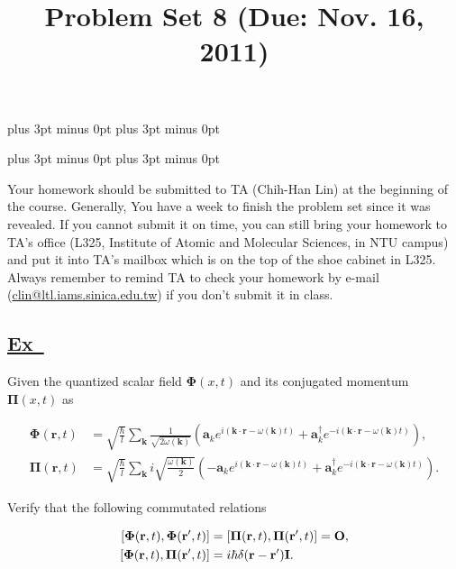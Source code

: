 \documentclass[a4paper,12pt]{article}
\newcommand{\excercise}{\addtocounter{section}{+1}
\subsection*{\underline{Ex~\thesection}}}
\begin{document}
\abovedisplayskip=-6pt plus 3pt minus 0pt
\belowdisplayskip=8pt plus 3pt minus 0pt

\abovedisplayshortskip=-6pt plus 3pt minus 0pt
\belowdisplayshortskip=8pt plus 3pt minus 0pt

\title{Problem Set 8 (Due: Nov. 16, 2011)}
\maketitle

Your homework should be submitted to TA (Chih-Han Lin) at the  beginning of the course. Generally, You have a week to finish the problem set since it was revealed. If you cannot submit it on time, you can still bring your homework to TA's office (L325, Institute of Atomic and Molecular Sciences, in NTU campus) and put it into TA's mailbox which is on the top of the shoe cabinet in L325. Always remember to remind TA to check your homework by e-mail (\url{clin@ltl.iams.sinica.edu.tw}) if you don't submit it in class.

%

\excercise
Given the quantized scalar field $\bm{\Phi}(x, t)$ and its conjugated momentum $\bm{\Pi}(x, t)$ as

\begin{align}
\bm{\Phi}(\mathbf{r},t)&= \sqrt{\frac{\hbar}{l}}\sum_\mathbf{k}\frac{1}{\sqrt{2\omega(\mathbf{k})}}\left(\bm{a}_{k}e^{i(\mathbf{k}\cdot\mathbf{r}-\omega(\mathbf{k})t)}+\bm{a}_{k}^\dag e^{-i(\mathbf{k}\cdot\mathbf{r}-\omega(\mathbf{k})t)}\right),\\
\bm{\Pi}(\mathbf{r},t)&= \sqrt{\frac{\hbar}{l}}\sum_\mathbf{k}i\sqrt{\frac{\omega(\mathbf{k})}{2}}\left(-\bm{a}_{k}e^{i(\mathbf{k}\cdot\mathbf{r}-\omega(\mathbf{k})t)}+\bm{a}_{k}^\dag e^{-i(\mathbf{k}\cdot\mathbf{r}-\omega(\mathbf{k})t)}\right).
\end{align}

Verify that the following commutated relations

\begin{align}
\protect [\bm{\Phi}(\mathbf{r},t),\bm{\Phi}(\mathbf{r}',t) ]&=[\bm{\Pi}(\mathbf{r},t),\bm{\Pi}(\mathbf{r}',t) ]=\mathbf{O},\\
\protect [\bm{\Phi}(\mathbf{r},t),\bm{\Pi}(\mathbf{r}',t) ]&=i\hbar\delta(\mathbf{r}-\mathbf{r}')\mathbf{I}.
\end{align}
\end{document}
